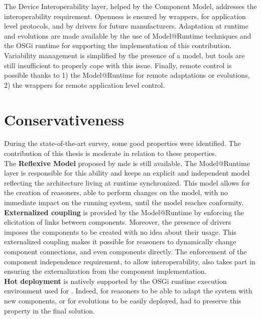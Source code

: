 The Device Interoperability layer, helped by the Component Model, addresses the interoperability requirement. Openness is ensured by wrappers, for application level protocols, and by drivers for future manufacturers. Adaptation at runtime and evolutions are made available by the use of Model@Runtime techniques and the OSGi runtime for supporting the implementation of this contribution. Variability management is simplified by the presence of a model, but tools are still insufficient to properly cope with this issue. Finally, remote control is possible thanks to 1) the Model@Runtime for remote adaptations or evolutions, 2) the wrappers for remote application level control.

\section{Conservativeness}

During the state-of-the-art survey, some good properties were identified. The contribution of this thesis is moderate in relation to these properties.\\

The {\bf Reflexive Model} proposed by \gls{mde} is still available. The Model@Runtime layer is responsible for this ability and keeps an explicit and independent model reflecting the architecture living at runtime synchronized. This model allows for the creation of reasoners, able to perform changes on the model, with no immediate impact on the running system, until the model reaches conformity.\\

{\bf Externalized coupling} is provided by the Model@Runtime by enforcing the elicitation of links between components. Moreover, the presence of drivers imposes the components to be created with no idea about their usage. This externalized coupling makes it possible for reasoners to dynamically change component connections, and even components directly. The enforcement of the component independence requirement, to allow interoperability, also takes part in ensuring the externalization from the component implementation.\\

{\bf Hot deployment} is natively supported by the OSGi runtime execution environment used for \enti{}. Indeed, for reasoners to be able to adapt the system with new components, or for evolutions to be easily deployed, \enti{} had to preserve this property in the final solution.\\

